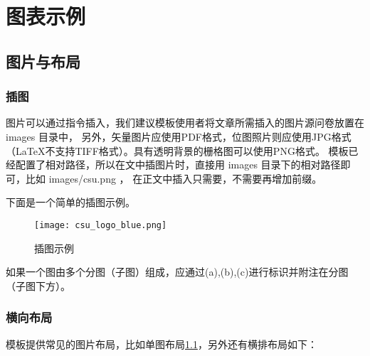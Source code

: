 \chapter{图表示例}

\section{图片与布局}

\subsection{插图}

图片可以通过指令插入，我们建议模板使用者将文章所需插入的图片源问卷放置在 images 目录中，
另外，矢量图片应使用PDF格式，位图照片则应使用JPG格式（LaTeX不支持TIFF格式）。具有透明背景的栅格图可以使用PNG格式。
模板已经配置了相对路径，所以在文中插图片时，直接用 images 目录下的相对路径即可，比如 images/csu.png ，
在正文中插入只需要，不需要再增加前缀。

下面是一个简单的插图示例。

\begin{figure}[hbt]
    \centering
    \texttt{[image: csu\_logo\_blue.png]}
    \caption{插图示例}
    \label{f.example}
\end{figure}


如果一个图由多个分图（子图）组成，应通过(a),(b),(c)进行标识并附注在分图（子图下方）。

\subsection{横向布局}

模板提供常见的图片布局，比如单图布局\ref{f.example}，另外还有横排布局如下：

